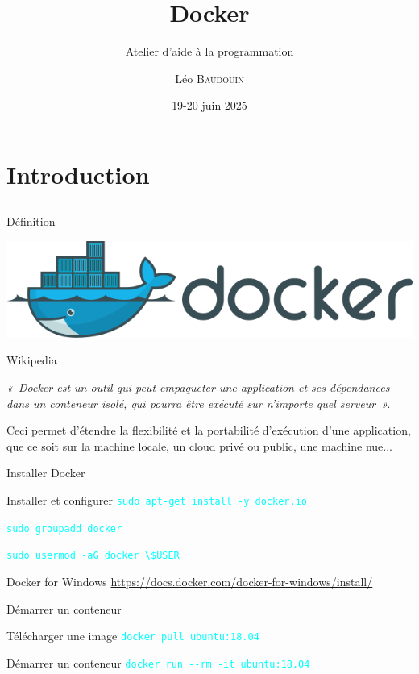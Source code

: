 \documentclass{beamer}
\title{Docker}
\subtitle{Atelier d'aide à la programmation}
\author{L\'eo \textsc{Baudouin}}
\institute{
  {\url{baudouin.leo @ gmail.com}}
}
\date{19-20 juin 2025}
\begin{document}
\begin{frame}
  \titlepage
\end{frame}

\section{Introduction}
\subsection{}

\begin{frame}{Définition}


\begin{center}
\includegraphics[width=0.5\linewidth]{images/docker-logo}
\end{center}

\begin{block}{Wikipedia}
{\it 
«~Docker est un outil qui peut empaqueter une application et ses dépendances dans un conteneur isolé, qui pourra être exécuté sur n'importe quel serveur~».

Ceci permet d'étendre la flexibilité et la portabilité d’exécution d'une application, que ce soit sur la machine locale, un cloud privé ou public, une machine nue...}
\end{block}
\end{frame}


\begin{frame}[fragile]{Installer Docker}

\begin{block}{Installer et configurer}
\textcolor{cyan}{\verb?sudo apt-get install -y docker.io?}

\textcolor{cyan}{\verb?sudo groupadd docker?}

\textcolor{cyan}{\verb?sudo usermod -aG docker \$USER?}
\end{block}

\begin{block}{Docker for Windows}
\href{https://docs.docker.com/docker-for-windows/install/}{https://docs.docker.com/docker-for-windows/install/}
\end{block}

\end{frame}


\begin{frame}{Démarrer un conteneur}

\begin{block}{Télécharger une image}
\textcolor{cyan}{\verb?docker pull ubuntu:18.04?}
\end{block}

\begin{block}{Démarrer un conteneur}
\textcolor{cyan}{\verb?docker run --rm -it ubuntu:18.04?}
\end{block}

\end{frame}
\end{document}
